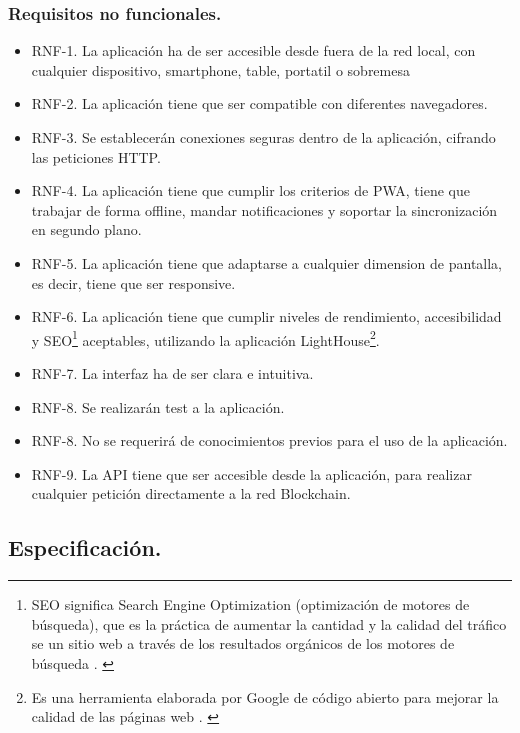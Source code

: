 \subsubsection{Requisitos no funcionales.}

\begin{itemize}
    \item[] RNF-1. La aplicación ha de ser accesible desde fuera de la red local, con cualquier dispositivo, smartphone, 
    table, portatil o sobremesa
    \item[] RNF-2. La aplicación tiene que ser compatible con diferentes navegadores.
    \item[] RNF-3. Se establecerán conexiones seguras dentro de la aplicación, cifrando las peticiones HTTP.
    \item[] RNF-4. La aplicación tiene que cumplir los criterios de PWA, tiene que trabajar de forma offline, mandar
    notificaciones y soportar la sincronización en segundo plano.
    \item[] RNF-5. La aplicación tiene que adaptarse a cualquier dimension de pantalla, es decir, tiene que ser responsive.
    \item[] RNF-6. La aplicación tiene que cumplir niveles de rendimiento, accesibilidad y SEO\footnote{ SEO significa 
    Search Engine Optimization (optimización de motores de búsqueda), que es la práctica de aumentar la cantidad y la 
    calidad del tráfico se un sitio web a través de los resultados orgánicos de los motores de búsqueda \cite{what-is-seo}. 
    \label{fnlabel}} aceptables, utilizando la aplicación LightHouse\footnote{ Es una herramienta elaborada por Google de 
    código abierto para mejorar la calidad de las páginas web \cite{lighthouse}. \label{fnlabel}}.
    \item[] RNF-7. La interfaz ha de ser clara e intuitiva.
    \item[] RNF-8. Se realizarán test a la aplicación.
    \item[] RNF-8. No se requerirá de conocimientos previos para el uso de la aplicación.
    \item[] RNF-9. La API tiene que ser accesible desde la aplicación, para realizar cualquier petición directamente
    a la red Blockchain.
\end{itemize}

\subsection{Especificación.}

